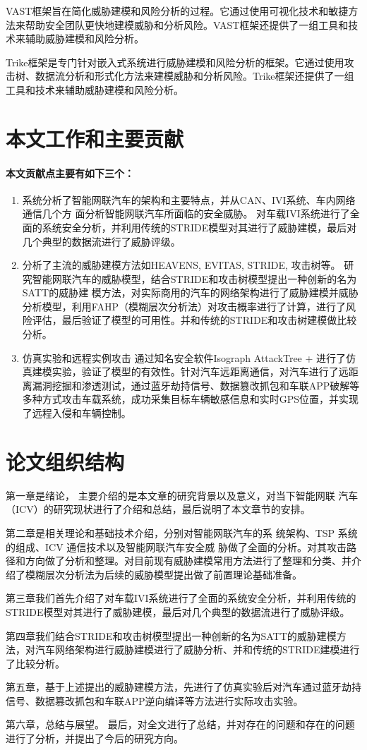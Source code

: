 VAST\cite{shostack2015vast}框架旨在简化威胁建模和风险分析的过程。它通过使用可视化技术和敏捷方法来帮助安全团队更快地建模威胁和分析风险。VAST框架还提供了一组工具和技术来辅助威胁建模和风险分析。

Trike框架\cite{larrondo2013trike}是专门针对嵌入式系统进行威胁建模和风险分析的框架。它通过使用攻击树、数据流分析和形式化方法来建模威胁和分析风险。Trike框架还提供了一组工具和技术来辅助威胁建模和风险分析。
\section{本文工作和主要贡献}
\paragraph{本文贡献点主要有如下三个：}

\begin{enumerate}
    \item 系统分析了智能网联汽车的架构和主要特点，并从CAN、IVI系统、车内网络通信几个方
    面分析智能网联汽车所面临的安全威胁。
    对车载IVI系统进行了全面的系统安全分析，并利用传统的STRIDE模型对其进行了威胁建模，最后对几个典型的数据流进行了威胁评级。
    \item 分析了主流的威胁建模方法如HEAVENS, EVITAS, STRIDE, 攻击树等。
    研究智能网联汽车的威胁模型，结合STRIDE和攻击树模型提出一种创新的名为SATT的威胁建
模方法，对实际商用的汽车的网络架构进行了威胁建模并威胁分析模型，利用FAHP（模糊层次分析法）对攻击概率进行了计算，进行了风险评估，最后验证了模型的可用性。并和传统的STRIDE和攻击树建模做比较分析。
    \item 仿真实验和远程实例攻击
    通过知名安全软件Isograph AttackTree + 进行了仿真建模实验，验证了模型的有效性。针对汽车远距离通信，对汽车进行了远距离漏洞挖掘和渗透测试，通过蓝牙劫持信号、数据篡改抓包和车联APP破解等多种方式攻击车载系统，成功采集目标车辆敏感信息和实时GPS位置，并实现了远程入侵和车辆控制。
\end{enumerate}


\section{论文组织结构}
第一章是绪论， 主要介绍的是本文章的研究背景以及意义，对当下智能网联
汽车（ICV）的研究现状进行了介绍和总结，最后说明了本文章节的安排。

第二章是相关理论和基础技术介绍，分别对智能网联汽车的系
统架构、TSP 系统的组成、ICV 通信技术以及智能网联汽车安全威
胁做了全面的分析。对其攻击路径和方向做了分析和整理。对目前现有威胁建模常用方法进行了整理和分类、并介绍了模糊层次分析法为后续的威胁模型提出做了前置理论基础准备。

第三章我们首先介绍了对车载IVI系统进行了全面的系统安全分析，并利用传统的STRIDE模型对其进行了威胁建模，最后对几个典型的数据流进行了威胁评级。

第四章我们结合STRIDE和攻击树模型提出一种创新的名为SATT的威胁建模方法，对汽车网络架构进行威胁建模进行了威胁分析、并和传统的STRIDE建模进行了比较分析。

第五章，基于上述提出的威胁建模方法，先进行了仿真实验后对汽车通过蓝牙劫持信号、数据篡改抓包和车联APP逆向编译等方法进行实际攻击实验。

第六章，总结与展望。
最后，对全文进行了总结，并对存在的问题和存在的问题进行了分析，并提出了今后的研究方向。
